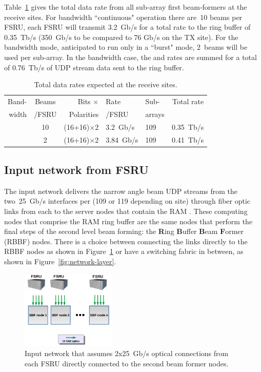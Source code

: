 \documentclass[12pt,a4paper]{article}
\begin{document}
Table~\ref{tab:rx:rates} gives the total data rate from all sub-array first beam-formers at the receive sites.
For \NBW{} bandwidth ``continuous" operation there are~10 beams per FSRU, each FSRU will transmit 3.2~Gb/s for a total rate to the ring buffer of 0.35~Tb/s (350~Gb/s to be compared to 76 Gb/s on the TX site).
For the \WBW{} bandwidth mode, anticipated to run only in a ``burst" mode, 
2~beams will be used per sub-array.
In the \WBW{} bandwidth case, the \WBW{} and \NBW{} rates are summed for a total of 0.76~Tb/s of UDP stream data sent to the ring buffer.
\begin{table}[h]
\centering
\begin{tabular}{rcrll|r}
{Band-} & {Beams} & {Bits $\times$}    & Rate    & Sub- & {Total rate} \\
{width} & {/FSRU} & {Polarities}       & {/FSRU} & arrays & \\ \hline
\NBW{}  & 10 & (16+16)$\times$2 & 3.2~Gb/s & 109 & 0.35~Tb/s \\
\WBW{} & 2 & (16+16)$\times$2 & 3.84~Gb/s & 109 & 0.41~Tb/s \\
\end{tabular}
\caption{Total data rates expected at the receive sites. \label{tab:rx:rates}}
\end{table}
\fi

\subsection{Input network from FSRU}
\label{sec:inputnet}

The input network delivers the narrow angle beam UDP streams from the two~25~Gb/s interfaces per \fsru (109 or 119 depending on site) through fiber optic links from each \fsru to the server nodes that contain the RAM \RB. 
These computing nodes that comprise the RAM ring buffer are the same nodes that perform the final steps of the second level beam forming: the 
{{\bf R}ing {\bf B}uffer {\bf B}eam {\bf F}ormer} (RBBF) nodes.
There is a choice between connecting the \fsru links directly to the RBBF nodes as shown in Figure~\ref{fig:inputnet-direct} or have a switching fabric in between, as shown in Figure~\ref{fig:network-layer}.
\begin{figure}
\centering
\includegraphics[width=0.4\textwidth]{input_network_7.png}
\caption{Input network that assumes 2x25~Gb/s optical connections from each FSRU directly connected to the second beam former nodes.
\label{fig:inputnet-direct}
}
\end{figure}
\end{document}
